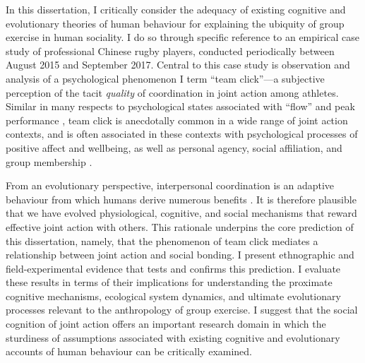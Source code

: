 In this dissertation, I critically consider the adequacy of existing cognitive and evolutionary theories of human behaviour for explaining the ubiquity of group exercise in human sociality.  I do so through specific reference to an empirical case study of professional Chinese rugby players, conducted periodically between August 2015 and September 2017. Central to this case study is observation and analysis of a psychological phenomenon I term ``team click''---a subjective perception  of the tacit \textit{quality} of coordination in joint action among athletes.  Similar in many respects to psychological states associated with ``flow'' and peak performance \citep{Csikszentmihalyi1992}, team click is anecdotally common in a wide range of joint action contexts, and is often associated in these contexts with psychological processes of positive affect and wellbeing, as well as personal agency, social affiliation, and group membership \citep{Marsh2009, Wheatley2012}.

From an evolutionary perspective, interpersonal coordination is an adaptive behaviour from which humans derive numerous benefits \citep{Tomasello2014}. It is therefore plausible that we have evolved physiological, cognitive, and social mechanisms that reward effective joint action with others. This rationale underpins the core prediction of this dissertation, namely, that the phenomenon of team click mediates a relationship between joint action and social bonding.  I present ethnographic and field-experimental evidence that tests and confirms this prediction.  I evaluate these results in terms of their implications for understanding the proximate cognitive mechanisms, ecological system dynamics, and ultimate evolutionary processes relevant to the anthropology of group exercise.  I suggest that the social cognition of joint action offers an important research domain in which the sturdiness of assumptions associated with existing cognitive and evolutionary accounts of human behaviour can be critically examined.


